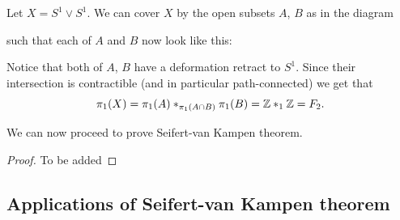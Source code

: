 \documentclass[11pt,a4paper]{article}
\begin{document}
\begin{example}
  \label{exmp:s-wedge-s}
  Let $X = S^1 \vee S^1$.
  We can cover $X$ by the open subsets $A$, $B$ as in the diagram
  \begin{center}
  \end{center}
  such that each of $A$ and $B$ now look like this:
  \begin{center}
  \end{center}
  Notice that both of $A$, $B$ have a deformation retract to $S^1$.
  Since their intersection is contractible (and in particular path-connected)
  we get that
  \[
    \pi_1(X) =
    \pi_1(A) *_{\pi_1(A \cap B)} \pi_1(B) =
    \mathbb{Z} *_1 \mathbb{Z} =
    F_2.
  \]
\end{example}

We can now proceed to prove Seifert-van Kampen theorem.
\begin{proof}
  To be added
\end{proof}

\subsection{Applications of Seifert-van Kampen theorem}
\end{document}
